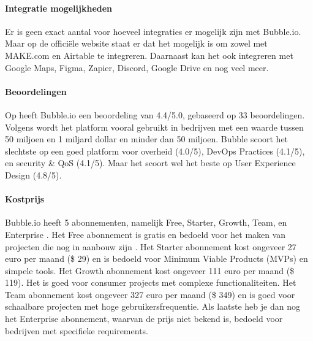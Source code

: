\paragraph{Integratie mogelijkheden}
Er is geen exact aantal voor hoeveel integraties er mogelijk zijn met Bubble.io. Maar op de officiële website \textcite{Bubble2024a} 
staat er dat het mogelijk is om zowel met MAKE.com en Airtable te integreren. Daarnaast kan het ook integreren met Google Maps, Figma, Zapier, Discord, Google Drive en nog veel meer.

\paragraph{Beoordelingen}
Op \textcite{Gartner2024} heeft Bubble.io een beoordeling van 4.4/5.0, gebaseerd op 33 beoordelingen. Volgens \textcite{Gartner2024}
wordt het platform vooral gebruikt in bedrijven met een waarde tussen 50 miljoen en 1 miljard dollar en minder dan 50 miljoen.
Bubble scoort het slechtste op een goed platform voor overheid (4.0/5), DevOps Practices (4.1/5), en security \& QoS  (4.1/5). Maar het scoort wel
het beste op User Experience Design (4.8/5).

\paragraph{Kostprijs}
Bubble.io heeft 5 abonnementen, namelijk Free, Starter, Growth, Team, en Enterprise \autocite{Bubble2024}.
Het Free abonnement is gratis en bedoeld voor het maken van projecten die nog in aanbouw zijn \autocite{Bubble2024}.
Het Starter abonnement kost ongeveer 27 euro per maand (\$ 29) en is bedoeld voor Minimum Viable Products (MVPs) en simpele tools.
Het Growth abonnement kost ongeveer 111 euro per maand (\$ 119). Het is goed voor consumer projects met complexe functionaliteiten.
Het Team abonnement kost ongeveer 327 euro per maand (\$ 349) en is goed voor schaalbare projecten met hoge gebruikersfrequentie. Als laatste heb je dan nog
het Enterprise abonnement, waarvan de prijs niet bekend is, bedoeld voor bedrijven met specifieke requirements.

\pagebreak
